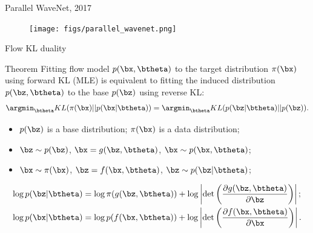 \begin{frame}{Parallel WaveNet, 2017}
	\begin{figure}
		\centering
		\texttt{[image: figs/parallel\_wavenet.png]}
	\end{figure}

\end{frame}
\begin{frame}{Flow KL duality}
	\begin{block}{Theorem}
		Fitting flow model $p(\bx, \btheta)$ to the target distribution $\pi(\bx)$ using forward KL (MLE) is equivalent to fitting the induced distribution $p(\bz, \btheta)$ to the base $p(\bz)$ using reverse KL:
		\[
			\argmin_{\btheta} KL(\pi(\bx) || p(\bx | \btheta)) = \argmin_{\btheta} KL(p(\bz | \btheta) || p(\bz)).
		\]
		\vspace{-0.3cm}
		\begin{itemize}
			\item $p(\bz)$ is a base distribution; $\pi(\bx)$ is a data distribution;
			\item $\bz \sim p(\bz)$, $\bx = g(\bz, \btheta)$, $\bx \sim p(\bx, \btheta)$;
			\item $\bx \sim \pi(\bx)$, $\bz = f(\bx, \btheta)$, $\bz \sim p(\bz | \btheta)$;
		\end{itemize}
		\vspace{-0.3cm}
		\begin{align*}
			\log p(\bz | \btheta) &= \log \pi(g(\bz, \btheta)) + \log \left| \det \left( \frac{\partial g(\bz, \btheta)}{\partial \bz}\right) \right|; \\
			\log p(\bx | \btheta) &= \log p(f(\bx, \btheta)) + \log \left| \det \left( \frac{\partial f(\bx, \btheta)}{\partial \bx}\right) \right|.
		\end{align*}
	\end{block}
\end{frame}
